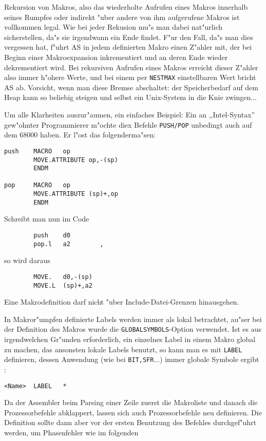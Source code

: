 \documentclass[12pt,a4paper,twoside]{report}
\newcommand{\tty}[1]{{\tt #1}}
\begin{document}
Rekursion von Makros, also das wiederholte Aufrufen eines Makros innerhalb
seines Rumpfes oder indirekt "uber andere von ihm aufgerufene Makros ist
vollkommen legal.  Wie bei jeder Rekusion mu"s man dabei nat"urlich
sicherstellen, da"s sie irgendwann ein Ende findet.  F"ur den Fall, da"s
man dies vergessen hat, f"uhrt AS in jedem definierten Makro einen Z"ahler
mit, der bei Beginn einer Makroexpansion inkrementiert und an deren Ende
wieder dekrementiert wird.  Bei rekursiven Aufrufen eines Makros erreicht
dieser Z"ahler also immer h"ohere Werte, und bei einem per {\tt NESTMAX}
einstellbaren Wert bricht AS ab.  Vorsicht, wenn man diese Bremse
abschaltet: der Speicherbedarf auf dem Heap kann so beliebig steigen und
selbst ein Unix-System in die Knie zwingen...
\par
Um alle Klarheiten auszur"aumen, ein einfaches Beispiel:
Ein an ,,Intel-Syntax'' gew"ohnter Programmierer m"ochte diex Befehle \tty{PUSH/POP}
unbedingt auch auf dem 68000 haben.  Er l"ost das
folgenderma"sen:
\begin{verbatim}
push    MACRO   op
        MOVE.ATTRIBUTE op,-(sp)
        ENDM

pop     MACRO   op
        MOVE.ATTRIBUTE (sp)+,op
        ENDM
\end{verbatim}
Schreibt man nun im Code
\begin{verbatim}
        push    d0
        pop.l   a2        ,
\end{verbatim}
so wird daraus
\begin{verbatim}
        MOVE.   d0,-(sp)
        MOVE.L  (sp)+,a2
\end{verbatim}
Eine Makrodefinition darf nicht "uber Include-Datei-Grenzen hinausgehen.
\par
In Makror"umpfen definierte Labels werden immer als lokal betrachtet,
au"ser bei der Definition des Makros wurde die
\tty{GLOBALSYMBOLS}-Option verwendet.  Ist es aus irgendwelchen Gr"unden
erforderlich, ein einzelnes Label in einem Makro global zu
machen, das ansonsten lokale Labels benutzt, so kann man es mit
\tty{LABEL} definieren, dessen Anwendung (wie bei \tty{BIT,SFR}...)
immer globale Symbole ergibt :
\begin{verbatim}
<Name>  LABEL   *
\end{verbatim}
Da der Assembler beim Parsing einer Zeile zuerst die Makroliste und
danach die Prozessorbefehle abklappert, lassen sich auch Prozessorbefehle
neu definieren.  Die Definition sollte dann aber vor der ersten Benutzung
des Befehles durchgef"uhrt werden, um Phasenfehler wie im folgenden
\end{document}
